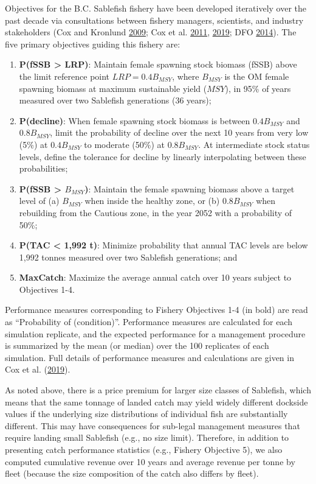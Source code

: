 \documentclass[11pt]{book}
\begin{document}
Objectives for the B.C. Sablefish fishery have been developed iteratively over the past decade via consultations between fishery managers, scientists, and industry stakeholders (Cox and Kronlund \protect\hyperlink{ref-cox2009evaluation}{2009}; Cox et al. \protect\hyperlink{ref-cox2011management}{2011}, \protect\hyperlink{ref-cox2019evaluating}{2019}; DFO \protect\hyperlink{ref-dfo2014performanc}{2014}). The five primary objectives guiding this fishery are:
\begin{enumerate}
\def\labelenumi{\arabic{enumi}.}

\item
  \textbf{P(fSSB \textgreater{} LRP)}: Maintain female spawning stock biomass (fSSB) above the limit reference point \(LRP = 0.4B_{MSY}\), where \(B_{MSY}\) is the OM female spawning biomass at maximum sustainable yield (\(MSY\)), in 95\% of years measured over two Sablefish generations (36 years);
\item
  \textbf{P(decline)}: When female spawning stock biomass is between \(0.4B_{MSY}\) and \(0.8B_{MSY}\), limit the probability of decline over the next 10 years from very low (5\%) at \(0.4B_{MSY}\) to moderate (50\%) at \(0.8B_{MSY}\). At intermediate stock status levels, define the tolerance for decline by linearly interpolating between these probabilities;
\item
  \textbf{P(fSSB \textgreater{} \(B_{MSY}\))}: Maintain the female spawning biomass above a target level of (a) \(B_{MSY}\) when inside the healthy zone, or (b) \(0.8B_{MSY}\) when rebuilding from the Cautious zone, in the year 2052 with a probability of 50\%;
\item
  \textbf{P(TAC \textless{} 1,992 t)}: Minimize probability that annual TAC levels are below 1,992 tonnes measured over two Sablefish generations; and
\item
  \textbf{MaxCatch}: Maximize the average annual catch over 10 years subject to Objectives 1-4.
\end{enumerate}
Performance measures corresponding to Fishery Objectives 1-4 (in bold) are read as ``Probability of (condition)''. Performance measures are calculated for each simulation replicate, and the expected performance for a management procedure is summarized by the mean (or median) over the 100 replicates of each simulation. Full details of performance measures and calculations are given in Cox et al. (\protect\hyperlink{ref-cox2019evaluating}{2019}).

As noted above, there is a price premium for larger size classes of Sablefish, which means that the same tonnage of landed catch may yield widely different dockside values if the underlying size distributions of individual fish are substantially different. This may have consequences for sub-legal management measures that require landing small Sablefish (e.g., no size limit). Therefore, in addition to presenting catch performance statistics (e.g., Fishery Objective 5), we also computed cumulative revenue over 10 years and average revenue per tonne by fleet (because the size composition of the catch also differs by fleet).
\end{document}
